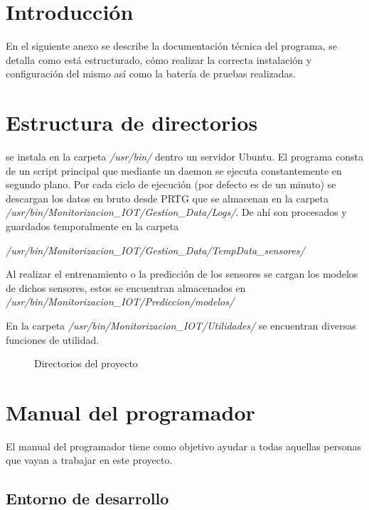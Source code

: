 

\section{Introducción}

En el siguiente anexo se describe la documentación técnica del programa, se detalla como está estructurado, cómo realizar la correcta instalación y configuración del mismo así como la batería de pruebas realizadas.

\section{Estructura de directorios}

\nombrePrograma se instala en la carpeta \textit{/usr/bin/} dentro un servidor Ubuntu. El programa consta de un script principal que mediante un daemon se ejecuta constantemente en segundo plano. Por cada ciclo de ejecución (por defecto es de un minuto) se descargan los datos en bruto desde PRTG que se almacenan en la carpeta \textit{/usr/bin/Monitorizacion\_IOT/Gestion\_Data/Logs/}. De ahí son procesados y guardados temporalmente en la carpeta

\textit{/usr/bin/Monitorizacion\_IOT/Gestion\_Data/TempData\_sensores/} 

Al realizar el entrenamiento o la predicción de los sensores se cargan los modelos de dichos sensores, estos se encuentran almacenados en \textit{/usr/bin/Monitorizacion\_IOT/Prediccion/modelos/}

En la carpeta \textit{/usr/bin/Monitorizacion\_IOT/Utilidades/} se encuentran diversas funciones de utilidad. 

\begin{figure}[h]
	\caption{Directorios del proyecto}
	\label{directoriosdelproyecto}
\end{figure}

\newpage
\section{Manual del programador}

El manual del programador tiene como objetivo ayudar a todas aquellas personas que vayan a trabajar en este proyecto.
\subsection{Entorno de desarrollo}


